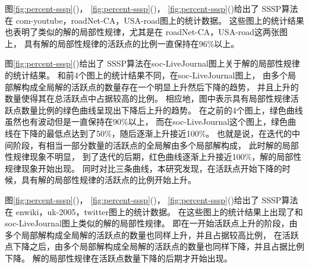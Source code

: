 图\ref{fig:percent-sssp}()，
\ref{fig:percent-sssp}()，
\ref{fig:percent-sssp}()给出了
SSSP算法在 com-youtube，roadNet-CA，USA-road图上的统计数据。
这些图上的统计结果也表明了类似的解的局部性规律，尤其是在
roadNet-CA，USA-road这两张图上，
具有解的局部性规律的活跃点的比例一直保持在96\%以上。

图\ref{fig:percent-sssp}()给出了
SSSP算法在soc-LiveJournal图上关于解的局部性规律的统计结果。
和前4个图上的统计结果不同，在soc-LiveJournal图上，
由多个局部解构成全局解的活跃点的数量存在一个明显上升然后下降的趋势，
并且上升的数量使得其在总活跃点中占据较高的比例。
相应地，图中表示具有局部性规律活跃点数量比例的绿色曲线呈现出下降后上升的趋势。
在之前的4个图上，绿色曲线虽然也有波动但是一直保持在90\%以上，
而在soc-LiveJournal这个图上，绿色曲线在下降的最低点达到了50\%，随后逐渐上升接近100\%。
也就是说，在迭代的中间阶段，有相当一部分数量的活跃点的全局解由多个局部解构成，
此时解的局部性规律现象不明显，
到了迭代的后期，红色曲线逐渐上升接近100\%，解的局部性规律现象开始出现。
同时对比三条曲线，本研究发现，在活跃点开始下降的时候，具有解的局部性规律的活跃点的比例开始上升。

图\ref{fig:percent-sssp}()，
\ref{fig:percent-sssp}()，
\ref{fig:percent-sssp}()给出了
SSSP算法在 enwiki，uk-2005，twitter图上的统计数据。
在这些图上的统计结果上出现了和soc-LiveJournal图上类似的解的局部性规律。
即在一开始活跃点上升的阶段，由多个局部解构成全局解的活跃点的数量也同样上升，并且占据较高比例，
在活跃点下降之后，由多个局部解构成全局解的活跃点的数量也同样下降，并且占据比例下降。
解的局部性规律在活跃点数量下降的后期才开始出现。



